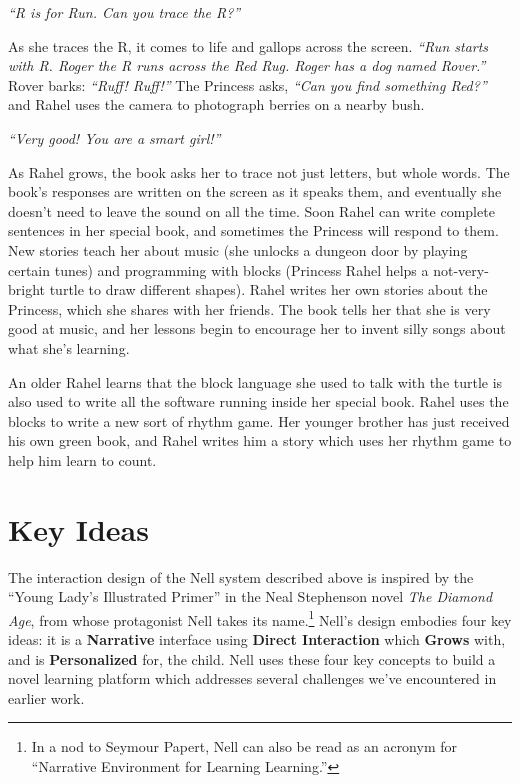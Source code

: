 \documentclass[preprint]{sig-alternate}
\begin{document}
\textit{``R is for Run.  Can you trace the R?''}

As she traces the R, it comes to life and gallops across the screen.
\textit{``Run starts with R.  Roger the R runs across the Red Rug.
Roger has a dog named Rover.''}  Rover barks: \textit{``Ruff! Ruff!''}  The
Princess asks, \textit{``Can you find something Red?''} and Rahel uses the
camera to photograph berries on a nearby bush.

\textit{``Very good!  You are a smart girl!''}

As Rahel grows, the book asks her to trace not just letters, but whole
words.  The book's responses are written on the screen as it speaks
them, and eventually she doesn't need to leave the sound on all the
time.  Soon Rahel can write complete sentences in her special book,
and sometimes the Princess will respond to them.  New stories teach her about
music (she unlocks a dungeon door by playing certain tunes) and
programming with blocks (Princess Rahel helps a not-very-bright turtle
to draw different shapes).  Rahel writes her own stories about the Princess,
which she shares with her friends.  The book tells her that she is
very good at music, and her lessons begin to encourage her to invent
silly songs about what she's learning.

An older Rahel learns that the block language she used to talk with
the turtle is also used to write all the software running inside
her special book.  Rahel uses the blocks to write a new sort of rhythm
game.  Her younger brother has just received his own green book,
and Rahel writes him a story which uses her rhythm game to help him learn
to count.

\section{Key Ideas}
The interaction design of the Nell system described above is inspired
by the ``Young Lady's Illustrated Primer'' in the Neal Stephenson
novel \textit{The Diamond Age}, from whose protagonist Nell takes its
name.\footnote{In a nod to Seymour Papert, Nell can also be read as an
acronym for ``Narrative Environment for Learning Learning.''}
Nell's design embodies four key ideas: it is a \textbf{Narrative}
interface using \textbf{Direct Interaction} which \textbf{Grows} with,
and is \textbf{Personalized} for, the child.
Nell uses these four key concepts to build a novel learning platform
which addresses several challenges we've encountered in earlier work.
\end{document}
